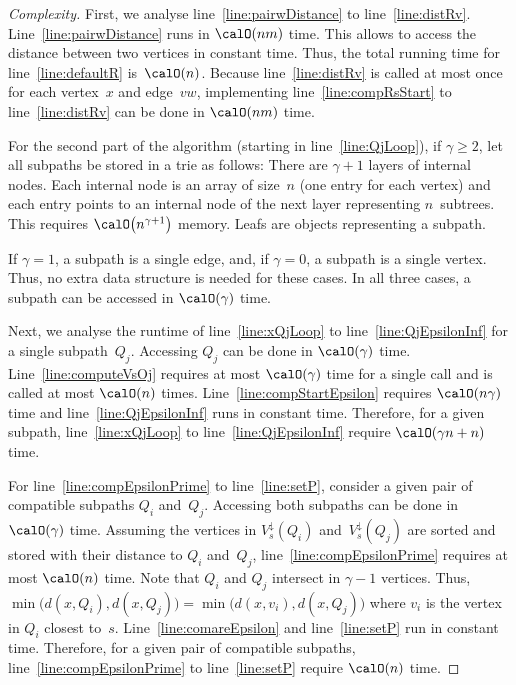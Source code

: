 \begin{proof}
    [Complexity]
First, we analyse line~\ref{line:pairwDistance} to line~\ref{line:distRv}.
Line~\ref{line:pairwDistance} runs in $\calO(nm)$ time.
This allows to access the distance between two vertices in constant time.
Thus, the total running time for line~\ref{line:defaultR} is~$\calO(n)$.
Because line~\ref{line:distRv} is called at most once for each vertex~$x$ and edge~$vw$, implementing line~\ref{line:compRsStart} to line~\ref{line:distRv} can be done in $\calO(nm)$ time.

For the second part of the algorithm (starting in line~\ref{line:QjLoop}), if $\gamma \geq 2$, let all subpaths be stored in a trie as follows:
There are $\gamma + 1$ layers of internal nodes.
Each internal node is an array of size~$n$ (one entry for each vertex) and each entry points to an internal node of the next layer representing $n$~subtrees.
This requires $\calO \big( n^{\gamma + 1} \big)$ memory.
Leafs are objects representing a subpath.

If $\gamma = 1$, a subpath is a single edge, and, if $\gamma = 0$, a subpath is a single vertex.
Thus, no extra data structure is needed for these cases.
In all three cases, a subpath can be accessed in $\calO(\gamma)$ time.

Next, we analyse the runtime of line~\ref{line:xQjLoop} to line~\ref{line:QjEpsilonInf} for a single subpath~$Q_j$.
Accessing $Q_j$ can be done in $\calO(\gamma)$ time.
Line~\ref{line:computeVsOj} requires at most $\calO(\gamma)$ time for a single call and is called at most $\calO(n)$ times.
Line~\ref{line:compStartEpsilon} requires $\calO(n\gamma)$ time and line~\ref{line:QjEpsilonInf} runs in constant time.
Therefore, for a given subpath, line~\ref{line:xQjLoop} to line~\ref{line:QjEpsilonInf} require $\calO(\gamma n + n)$ time.

For line~\ref{line:compEpsilonPrime} to line~\ref{line:setP}, consider a given pair of compatible subpaths $Q_i$ and~$Q_j$.
Accessing both subpaths can be done in $\calO(\gamma)$ time.
Assuming the vertices in $V^\downarrow_s(Q_i)$ and~$V^\downarrow_s(Q_j)$ are sorted and stored with their distance to $Q_i$ and~$Q_j$, line~\ref{line:compEpsilonPrime} requires at most $\calO(n)$ time.
Note that $Q_i$ and $Q_j$ intersect in $\gamma - 1$ vertices.
Thus, $\min \big( d(x, Q_i), d(x, Q_j) \big) =  \min \big( d(x, v_i), d(x, Q_j) \big)$ where $v_i$ is the vertex in $Q_i$ closest to~$s$.
Line~\ref{line:comareEpsilon} and line~\ref{line:setP} run in constant time.
Therefore, for a given pair of compatible subpaths, line~\ref{line:compEpsilonPrime} to line~\ref{line:setP} require $\calO(n)$ time.


\end{proof}
